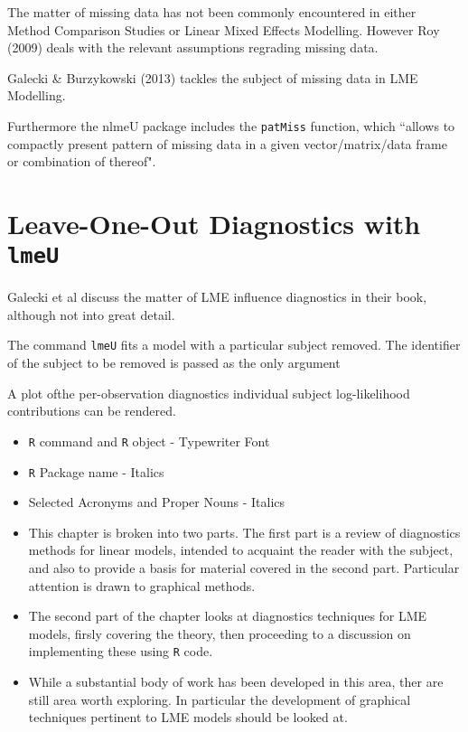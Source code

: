 \documentclass[12pt, a4paper]{report}
\theoremstyle{plain}
\theoremstyle{definition}
\theoremstyle{remark}
\begin{document}
The matter of missing data has not been commonly encountered in either Method Comparison Studies or Linear Mixed Effects Modelling. However Roy (2009) deals with the relevant assumptions regrading missing data.

Galecki \& Burzykowski (2013) tackles the subject of missing data in LME Modelling.

Furthermore the nlmeU package includes the \texttt{patMiss} function, which ``allows to compactly present pattern of missing data in a given vector/matrix/data
frame or combination of thereof".


\section{Leave-One-Out Diagnostics with \texttt{lmeU}}
Galecki et al discuss the matter of LME influence diagnostics in their book, although not into great detail.


The command \texttt{lmeU} fits a model with a particular subject removed. The identifier of the subject to be removed is passed as the only argument

A plot ofthe per-observation diagnostics individual subject log-likelihood contributions can be rendered.


\begin{framed} 
	\begin{itemize}
		\item \texttt{R} command and \texttt{R} object - Typewriter Font
		\item \texttt{R} Package name - Italics
		\item Selected Acronyms and Proper Nouns - Italics
	\end{itemize}
\end{framed}
\medskip

\begin{itemize}	
	\item This chapter is broken into two parts. The first part is a review of diagnostics methods for linear models, intended to acquaint the
	reader with the subject, and also to provide a basis for material covered in the second part. Particular attention is drawn to graphical methods.
	
	\item The second part of the chapter looks at diagnostics techniques for LME models, firsly covering the theory, then proceeding to a discussion on 
	implementing these using \texttt{R} code.
	\item While a substantial body of work has been developed in this area, ther are still area worth exploring. 
	In particular the development of graphical techniques pertinent to LME models should be looked at.
\end{itemize}
\end{document}
